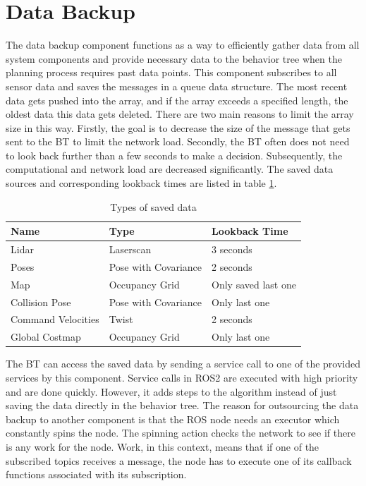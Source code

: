 \section{Data Backup}

The data backup component functions as a way to efficiently gather data from all system components and provide necessary data to the behavior tree when the planning process requires past data points. This component subscribes to all sensor data and saves the messages in a queue data structure. The most recent data gets pushed into the array, and if the array exceeds a specified length, the oldest data this data gets deleted. There are two main reasons to limit the array size in this way. Firstly, the goal is to decrease the size of the message that gets sent to the BT to limit the network load. Secondly, the BT often does not need to look back further than a few seconds to make a decision. Subsequently, the computational and network load are decreased significantly. The saved data sources and corresponding lookback times are listed in table \ref{tab:data_backup_types}. 

\begin{table}[ht]
	\centering
	\caption{Types of saved data}
	\label{tab:data_backup_types}
	\renewcommand{\arraystretch}{1.5}
	\begin{tabular}{ | l | l | l | }
		\hline
		\textbf{Name} & \textbf{Type} & \textbf{Lookback Time} \\ 
		\hline
		Lidar & Laserscan & 3 seconds \\
		\hline
		Poses & Pose with Covariance & 2 seconds\\ 
		\hline
		Map & Occupancy Grid & Only saved last one \\ 
		\hline
		Collision Pose & Pose with Covariance & Only last one \\
		\hline
		Command Velocities & Twist & 2 seconds\\
		\hline 	
		Global Costmap & Occupancy Grid & Only last one \\
		\hline
	\end{tabular}
\end{table}

The BT can access the saved data by sending a service call to one of the provided services by this component. Service calls in ROS2 are executed with high priority and are done quickly. However, it adds steps to the algorithm instead of just saving the data directly in the behavior tree. The reason for outsourcing the data backup to another component is that the ROS node needs an executor which constantly spins the node. The spinning action checks the network to see if there is any work for the node. Work, in this context, means that if one of the subscribed topics receives a message, the node has to execute one of its callback functions associated with its subscription. 

